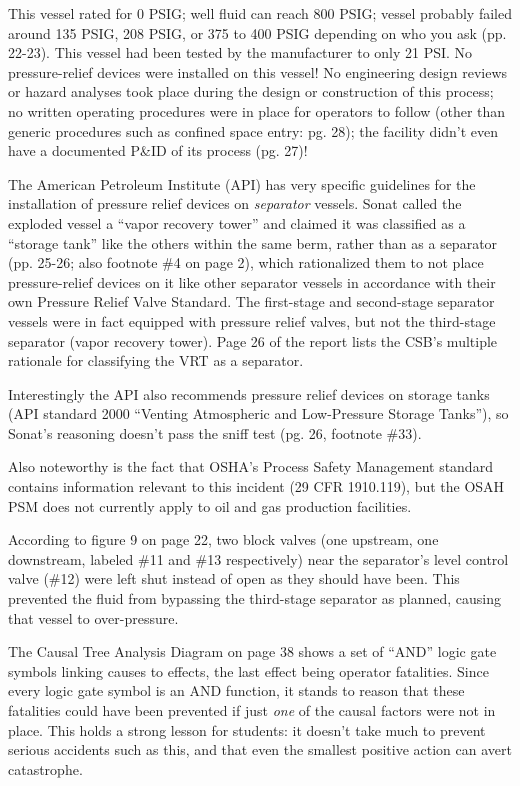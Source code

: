 This vessel rated for 0 PSIG; well fluid can reach 800 PSIG; vessel probably failed around 135 PSIG, 208 PSIG, or 375 to 400 PSIG depending on who you ask (pp. 22-23).  This vessel had been tested by the manufacturer to only 21 PSI.  No pressure-relief devices were installed on this vessel!  No engineering design reviews or hazard analyses took place during the design or construction of this process; no written operating procedures were in place for operators to follow (other than generic procedures such as confined space entry: pg. 28); the facility didn't even have a documented P\&ID of its process (pg. 27)!

\vskip 10pt

The American Petroleum Institute (API) has very specific guidelines for the installation of pressure relief devices on {\it separator} vessels.  Sonat called the exploded vessel a ``vapor recovery tower'' and claimed it was classified as a ``storage tank'' like the others within the same berm, rather than as a separator (pp. 25-26; also footnote \#4 on page 2), which rationalized them to not place pressure-relief devices on it like other separator vessels in accordance with their own Pressure Relief Valve Standard.  The first-stage and second-stage separator vessels were in fact equipped with pressure relief valves, but not the third-stage separator (vapor recovery tower).  Page 26 of the report lists the CSB's multiple rationale for classifying the VRT as a separator.

Interestingly the API also recommends pressure relief devices on storage tanks (API standard 2000 ``Venting Atmospheric and Low-Pressure Storage Tanks''), so Sonat's reasoning doesn't pass the sniff test (pg. 26, footnote \#33).

Also noteworthy is the fact that OSHA's Process Safety Management standard contains information relevant to this incident (29 CFR 1910.119), but the OSAH PSM does not currently apply to oil and gas production facilities.

\vskip 10pt

According to figure 9 on page 22, two block valves (one upstream, one downstream, labeled \#11 and \#13 respectively) near the separator's level control valve (\#12) were left shut instead of open as they should have been.  This prevented the fluid from bypassing the third-stage separator as planned, causing that vessel to over-pressure.

\vskip 10pt

The Causal Tree Analysis Diagram on page 38 shows a set of ``AND'' logic gate symbols linking causes to effects, the last effect being operator fatalities.  Since every logic gate symbol is an AND function, it stands to reason that these fatalities could have been prevented if just {\it one} of the causal factors were not in place.  This holds a strong lesson for students: it doesn't take much to prevent serious accidents such as this, and that even the smallest positive action can avert catastrophe.


